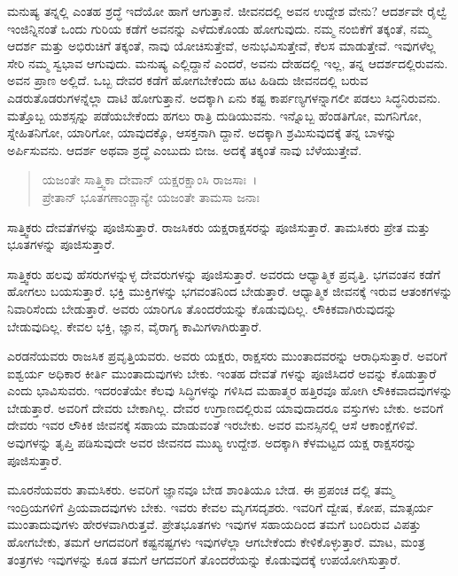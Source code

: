 ಮನುಷ್ಯ ತನ್ನಲ್ಲಿ ಎಂತಹ ಶ್ರದ್ಧೆ ಇದೆಯೋ ಹಾಗೆ ಆಗುತ್ತಾನೆ. ಜೀವನದಲ್ಲಿ ಅವನ ಉದ್ದೇಶ ವೇನು? ಆದರ್ಶವೇ ರೈಲ್ವೆ ಇಂಜಿನ್ನಿನಂತೆ ಒಂದು ಗುರಿಯ ಕಡೆಗೆ ಅವನನ್ನು ಎಳೆದುಕೊಂಡು ಹೋಗುವುದು. ನಮ್ಮ ನಂಬಿಕೆಗೆ ತಕ್ಕಂತೆ, ನಮ್ಮ ಆದರ್ಶ ಮತ್ತು ಅಭಿರುಚಿಗೆ ತಕ್ಕಂತೆ, ನಾವು ಯೋಚಿಸುತ್ತೇವೆ, ಅನುಭವಿಸುತ್ತೇವೆ, ಕೆಲಸ ಮಾಡುತ್ತೇವೆ. ಇವುಗಳೆಲ್ಲ ಸೇರಿ ನಮ್ಮ ಸ್ವಭಾವ ಆಗುವುದು. ಮನುಷ್ಯ ಎಲ್ಲಿದ್ದಾನೆ ಎಂದರೆ, ಅವನು ದೇಹದಲ್ಲಿ ಇಲ್ಲ, ತನ್ನ ಆದರ್ಶದಲ್ಲಿರುವನು. ಅವನ ಪ್ರಾಣ ಅಲ್ಲಿದೆ. ಒಬ್ಬ ದೇವರ ಕಡೆಗೆ ಹೋಗಬೇಕೆಂದು ಹಟ ಹಿಡಿದು ಜೀವನದಲ್ಲಿ ಬರುವ ಎಡರುತೊಡರುಗಳನ್ನೆಲ್ಲಾ ದಾಟಿ ಹೋಗುತ್ತಾನೆ. ಅದಕ್ಕಾಗಿ ಏನು ಕಷ್ಟ ಕಾರ್ಪಣ್ಯಗಳನ್ನಾಗಲೀ ಪಡಲು ಸಿದ್ಧನಿರುವನು. ಮತ್ತೊಬ್ಬ ಯಶಸ್ಸನ್ನು ಪಡೆಯಬೇಕೆಂದು ಹಗಲು ರಾತ್ರಿ ದುಡಿಯುವನು. ಇನ್ನೊಬ್ಬ ಹೆಂಡತಿಗೋ, ಮಗನಿಗೋ, ಸ್ನೇಹಿತನಿಗೋ, ಯಾರಿಗೋ, ಯಾವುದಕ್ಕೊ, ಆಸಕ್ತನಾಗಿ ದ್ದಾನೆ. ಅದಕ್ಕಾಗಿ ಶ್ರಮಿಸುವುದಕ್ಕೆ ತನ್ನ ಬಾಳನ್ನು ಅರ್ಪಿಸುವನು. ಆದರ್ಶ ಅಥವಾ ಶ್ರದ್ಧೆ ಎಂಬುದು ಬೀಜ. ಅದಕ್ಕೆ ತಕ್ಕಂತೆ ನಾವು ಬೆಳೆಯುತ್ತೇವೆ.

\begin{verse}
ಯಜಂತೇ ಸಾತ್ತ್ವಿಕಾ ದೇವಾನ್ ಯಕ್ಷರಕ್ಷಾಂಸಿ ರಾಜಸಾಃ~।\\ಪ್ರೇತಾನ್ ಭೂತಗಣಾಂಶ್ಚಾನ್ಯೇ ಯಜಂತೇ ತಾಮಸಾ ಜನಾಃ 
\end{verse}

{\small ಸಾತ್ತ್ವಿಕರು ದೇವತೆಗಳನ್ನು ಪೂಜಿಸುತ್ತಾರೆ. ರಾಜಸಿಕರು ಯಕ್ಷರಾಕ್ಷಸರನ್ನು ಪೂಜಿಸುತ್ತಾರೆ. ತಾಮಸಿಕರು ಪ್ರೇತ ಮತ್ತು ಭೂತಗಳನ್ನು ಪೂಜಿಸುತ್ತಾರೆ.}

ಸಾತ್ತ್ವಿಕರು ಹಲವು ಹೆಸರುಗಳನ್ನುಳ್ಳ ದೇವರುಗಳನ್ನು ಪೂಜಿಸುತ್ತಾರೆ. ಅವರದು ಆಧ್ಯಾತ್ಮಿಕ ಪ್ರವೃತ್ತಿ. ಭಗವಂತನ ಕಡೆಗೆ ಹೋಗಲು ಬಯಸುತ್ತಾರೆ. ಭಕ್ತಿ ಮುಕ್ತಿಗಳನ್ನು ಭಗವಂತನಿಂದ ಬೇಡುತ್ತಾರೆ. ಆಧ್ಯಾತ್ಮಿಕ ಜೀವನಕ್ಕೆ ಇರುವ ಆತಂಕಗಳನ್ನು ನಿವಾರಿಸೆಂದು ಬೇಡುತ್ತಾರೆ. ಅವರು ಯಾರಿಗೂ ತೊಂದರೆಯನ್ನು ಕೊಡುವುದಿಲ್ಲ. ಲೌಕಿಕವಾಗಿರುವುದನ್ನು ಬೇಡುವುದಿಲ್ಲ. ಕೇವಲ ಭಕ್ತಿ, ಜ್ಞಾನ, ವೈರಾಗ್ಯ ಕಾಮಿಗಳಾಗಿರುತ್ತಾರೆ.

ಎರಡನೆಯವರು ರಾಜಸಿಕ ಪ್ರವೃತ್ತಿಯವರು. ಅವರು ಯಕ್ಷರು, ರಾಕ್ಷಸರು ಮುಂತಾದವರನ್ನು ಆರಾಧಿಸುತ್ತಾರೆ. ಅವರಿಗೆ ಐಶ್ವರ್ಯ ಅಧಿಕಾರ ಕೀರ್ತಿ ಮುಂತಾದುವುಗಳು ಬೇಕು. ಇಂತಹ ದೇವತೆ ಗಳನ್ನು ಪೂಜಿಸಿದರೆ ಅವನ್ನು ಕೊಡುತ್ತಾರೆ ಎಂದು ಭಾವಿಸುವರು. ಇದರಂತೆಯೇ ಕೆಲವು ಸಿದ್ಧಿಗಳನ್ನು ಗಳಿಸಿದ ಮಹಾತ್ಮರ ಹತ್ತಿರವೂ ಹೋಗಿ ಲೌಕಿಕವಾದವುಗಳನ್ನು ಬೇಡುತ್ತಾರೆ. ಅವರಿಗೆ ದೇವರು ಬೇಕಾಗಿಲ್ಲ. ದೇವರ ಉಗ್ರಾಣದಲ್ಲಿರುವ ಯಾವುದಾದರೂ ವಸ್ತುಗಳು ಬೇಕು. ಅವರಿಗೆ ದೇವರು ಇವರ ಲೌಕಿಕ ಜೀವನಕ್ಕೆ ಸಹಾಯ ಮಾಡುವಂತೆ ಇರಬೇಕು. ಅವರ ಮನಸ್ಸಿನಲ್ಲಿ ಆಸೆ ಆಕಾಂಕ್ಷೆಗಳಿವೆ. ಅವುಗಳನ್ನು ತೃಪ್ತಿ ಪಡಿಸುವುದೇ ಅವರ ಜೀವನದ ಮುಖ್ಯ ಉದ್ದೇಶ. ಅದಕ್ಕಾಗಿ ಕೆಳಮಟ್ಟದ ಯಕ್ಷ ರಾಕ್ಷಸರನ್ನು ಪೂಜಿಸುತ್ತಾರೆ.

ಮೂರನೆಯವರು ತಾಮಸಿಕರು. ಅವರಿಗೆ ಜ್ಞಾನವೂ ಬೇಡ ಶಾಂತಿಯೂ ಬೇಡ. ಈ ಪ್ರಪಂಚ ದಲ್ಲಿ ತಮ್ಮ ಇಂದ್ರಿಯಗಳಿಗೆ ಪ್ರಿಯವಾದವುಗಳು ಬೇಕು. ಇವರು ಕೇವಲ ಮೃಗಸದೃಶರು. ಇವರಿಗೆ ದ್ವೇಷ, ಕೋಪ, ಮಾತ್ಸರ್ಯ ಮುಂತಾದುವುಗಳು ಹೇರಳವಾಗಿರುತ್ತವೆ. ಪ್ರೇತಭೂತಗಳು ಇವುಗಳ ಸಹಾಯದಿಂದ ತಮಗೆ ಬಂದಿರುವ ವಿಪತ್ತು ಹೋಗಬೇಕು, ತಮಗೆ ಆಗದವರಿಗೆ ಕಷ್ಟನಷ್ಟಗಳು ಇವುಗಳೆಲ್ಲಾ ಆಗಬೇಕೆಂದು ಕೇಳಿಕೊಳ್ಳುತ್ತಾರೆ. ಮಾಟ, ಮಂತ್ರ ತಂತ್ರಗಳು ಇವುಗಳನ್ನು ಕೂಡ ತಮಗೆ ಆಗದವರಿಗೆ ತೊಂದರೆಯನ್ನು ಕೊಡುವುದಕ್ಕೆ ಉಪಯೋಗಿಸುತ್ತಾರೆ.

